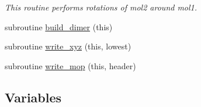 \begin{DoxyCompactItemize}
\begin{DoxyCompactList}\small\item\em This routine performs rotations of mol2 around mol1. \end{DoxyCompactList}\item 
subroutine \hyperlink{namespacemod__read__molecules_a2766cc4e8b825aea9e9695ee50fbd2f9}{build\+\_\+dimer} (this)
\item 
subroutine \hyperlink{namespacemod__read__molecules_ab4af6b28d9b99eb519efb212a5f02f58}{write\+\_\+xyz} (this, lowest)
\item 
subroutine \hyperlink{namespacemod__read__molecules_a79baec2daf0d11f0bd50d405874d4186}{write\+\_\+mop} (this, header)
\end{DoxyCompactItemize}
\subsection*{Variables}
